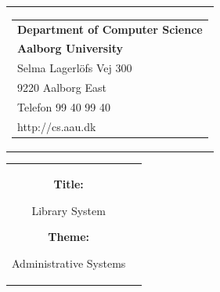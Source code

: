 \documentclass[11pt]{article}
\begin{document}
\thispagestyle{empty}
\begin{titlepage}
\begin{nopagebreak}
{\samepage 
\begin{tabular}{r}
\parbox{\textwidth}{  
\hfill \parbox{4.9cm}{\begin{tabular}{l}
{\sf\small \textbf{Department of Computer Science}}\\
{\sf\small \textbf{Aalborg University}}\\
{\sf\small Selma Lagerlöfs Vej 300} \\
{\sf\small 9220 Aalborg East} \\
{\sf\small Telefon 99 40 99 40} \\
{\sf\small http://cs.aau.dk}
\end{tabular}}}
\\
\end{tabular}

\begin{tabular}{cc}
\parbox{7cm}{
\begin{description}

\item {\bf Title:} 

Library System
  
\item {\bf Theme:} 

Administrative Systems

\end{description}

\parbox{8cm}{

}}
\end{tabular}}
\end{nopagebreak}
\end{titlepage}
\end{document}
